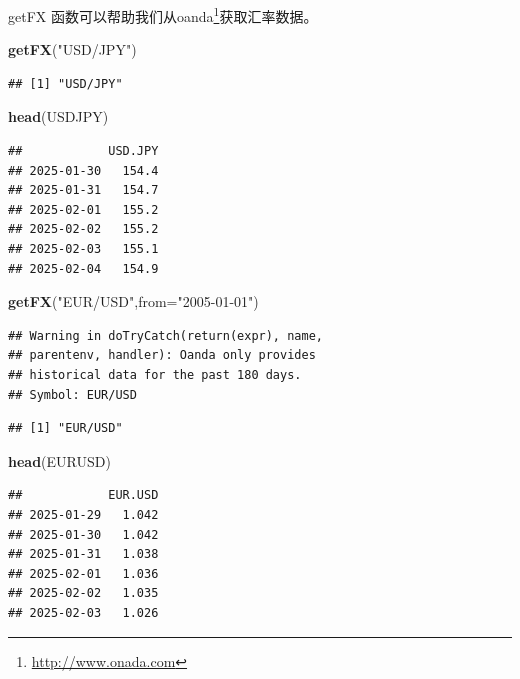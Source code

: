 \documentclass[]{ctexbook}
\newenvironment{Shaded}{\begin{snugshade}}{\end{snugshade}}
\newcommand{\AttributeTok}[1]{\textcolor[rgb]{0.13,0.29,0.53}{#1}}
\newcommand{\FunctionTok}[1]{\textcolor[rgb]{0.13,0.29,0.53}{\textbf{#1}}}
\newcommand{\NormalTok}[1]{#1}
\newcommand{\StringTok}[1]{\textcolor[rgb]{0.31,0.60,0.02}{#1}}
\renewcommand{\href}[2]{#2\footnote{\url{#1}}}
\begin{document}
getFX 函数可以帮助我们从\href{http://www.onada.com}{oanda}获取汇率数据。

\begin{Shaded}
\begin{Highlighting}[]
\FunctionTok{getFX}\NormalTok{(}\StringTok{"USD/JPY"}\NormalTok{)}
\end{Highlighting}
\end{Shaded}

\begin{verbatim}
## [1] "USD/JPY"
\end{verbatim}

\begin{Shaded}
\begin{Highlighting}[]
\FunctionTok{head}\NormalTok{(USDJPY)}
\end{Highlighting}
\end{Shaded}

\begin{verbatim}
##            USD.JPY
## 2025-01-30   154.4
## 2025-01-31   154.7
## 2025-02-01   155.2
## 2025-02-02   155.2
## 2025-02-03   155.1
## 2025-02-04   154.9
\end{verbatim}

\begin{Shaded}
\begin{Highlighting}[]
\FunctionTok{getFX}\NormalTok{(}\StringTok{"EUR/USD"}\NormalTok{,}\AttributeTok{from=}\StringTok{"2005{-}01{-}01"}\NormalTok{)}
\end{Highlighting}
\end{Shaded}

\begin{verbatim}
## Warning in doTryCatch(return(expr), name,
## parentenv, handler): Oanda only provides
## historical data for the past 180 days.
## Symbol: EUR/USD
\end{verbatim}

\begin{verbatim}
## [1] "EUR/USD"
\end{verbatim}

\begin{Shaded}
\begin{Highlighting}[]
\FunctionTok{head}\NormalTok{(EURUSD)}
\end{Highlighting}
\end{Shaded}

\begin{verbatim}
##            EUR.USD
## 2025-01-29   1.042
## 2025-01-30   1.042
## 2025-01-31   1.038
## 2025-02-01   1.036
## 2025-02-02   1.035
## 2025-02-03   1.026
\end{verbatim}
\end{document}
